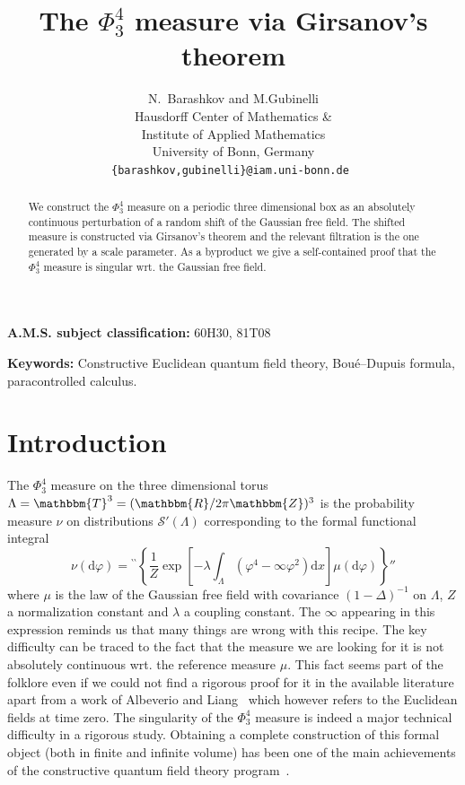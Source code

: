\documentclass[11pt]{article}
\newcommand{\mathd}{\mathrm{d}}
\newcommand{\tmaffiliation}[1]{\\ #1}
\newcommand{\tmsep}{, }
\newcommand{\tmkeywords}{\textbf{Keywords:} }
\newcommand{\tmmsc}{\textbf{A.M.S. subject classification:} }
\newcommand{\CS}{\mathscr{S}}
\begin{document}
\title{ The $\Phi^4_3$ measure via Girsanov's theorem}

\author{
  N.~Barashkov and M.Gubinelli
  \tmaffiliation{Hausdorff Center of Mathematics \&\\
  Institute of Applied Mathematics\\
  University of Bonn, Germany}\\
  \tt{\{barashkov,gubinelli\}@iam.uni-bonn.de}
}

\maketitle

\begin{abstract}
  We construct the $\Phi^4_3$ measure on a periodic three dimensional box as
  an absolutely continuous perturbation of a random shift of the Gaussian free
  field. The shifted measure is constructed via Girsanov's theorem and the
  relevant filtration is the one generated by a scale parameter. As a
  byproduct we give a self-contained proof that the $\Phi^4_3$ measure is
  singular wrt. the Gaussian free field.
\end{abstract}

\tmmsc{60H30}{\tmsep}{81T08}

\tmkeywords{Constructive Euclidean quantum field theory, Bou{\'e}--Dupuis
formula, paracontrolled calculus.}

\section{Introduction}

The $\Phi^4_3$ measure on the three dimensional torus \ $\Lambda
=\mathbbm{T}^3 = (\mathbbm{R}/ 2 \pi \mathbbm{Z})^3$ is the probability
measure $\nu$ on distributions $\CS' (\Lambda)$ corresponding to the formal
functional integral
\begin{equation}
  \nu (\mathd \varphi) = {}^{\backprime\backprime} \left\{ \frac{1}{Z} \exp
  \left[ - \lambda \int_{\Lambda} (\varphi^4 - \infty \varphi^2) \mathd x
  \right] \mu (\mathd \varphi) \right\}'' \label{eq:phi43}
\end{equation}
where $\mu$ is the law of the Gaussian free field with covariance $(1 -
\Delta)^{- 1}$ on $\Lambda$, $Z$ a normalization constant and $\lambda$ a
coupling constant. The $\infty$ appearing in this expression reminds us that
many things are wrong with this recipe. The key difficulty can be traced to
the fact that the measure we are looking for it is not absolutely continuous
wrt. the reference measure $\mu$. This fact seems part of the folklore even if
we could not find a rigorous proof for it in the available literature apart
from a work of Albeverio and Liang~{\cite{albeverio_remark_2008}} which
however refers to the Euclidean fields at time zero. The singularity of the
$\Phi^4_3$ measure is indeed a major technical difficulty in a rigorous study.
Obtaining a complete construction of this formal object (both in finite and
infinite volume) has been one of the main achievements of the constructive
quantum field theory
program~{\cite{glimm_positivity_1973,feldman_lambda_1974,park_lambda_1975,feldman_wightman_1976,magnen_infinite_1976,benfatto_ultraviolet_1980,brydges_new_1983}}.
\end{document}
